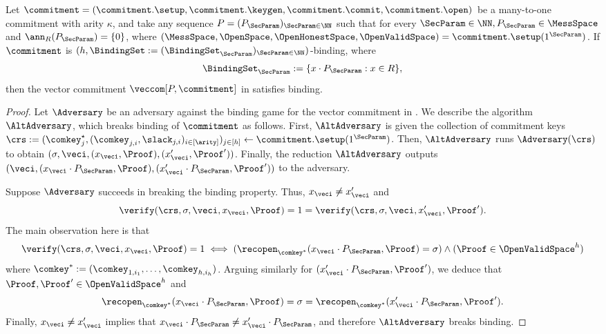     \begin{lemma}\label{lem:VC-binding}
    Let  $\commitment = (\commitment.\setup, \commitment.\keygen,\commitment.\commit,\commitment.\open)$ be a many-to-one commitment with arity $\kappa$, and take any sequence $P = (P_\SecParam)_{\SecParam \in \NN}$ such that for every $\SecParam \in \NN, P_\SecParam \in \MessSpace$ and $\ann_R(P_\SecParam) = \{0\}$, where $ (\MessSpace,\OpenSpace,\OpenHonestSpace,\OpenValidSpace) = \commitment.\setup(1^\SecParam)$. If $\commitment$ is $(h,\BindingSet := (\BindingSet_\SecParam)_{\SecParam \in \NN})$-binding, where \[\BindingSet_\SecParam := \{ x \cdot P_\SecParam : x \in R\},\] then the vector commitment $\veccom[P,\commitment]$ in  satisfies binding.
    \end{lemma}
    \begin{proof}
    Let $\Adversary$ be an adversary against the binding game for the vector commitment in . We describe the algorithm $\AltAdversary$, which breaks binding of $\commitment$ as follows. First, $\AltAdversary$ is given the collection of commitment keys  $\crs:= (\comkey^\star_j,(\comkey_{j,i},\slack_{j,i})_{i\in [\arity]})_{j \in [h]} \gets \commitment.\setup(1^\SecParam)$. Then, $\AltAdversary$ runs $\Adversary(\crs)$  to obtain $(\sigma,\veci,(x_\veci,\Proof), (x'_\veci,\Proof'))$. Finally, the reduction $\AltAdversary$ outputs $(\veci,(x_\veci \cdot P_\SecParam,\Proof), (x'_\veci \cdot P_\SecParam,\Proof'))$ to the adversary.

    Suppose $\Adversary$ succeeds in breaking the binding property. Thus, $x_\veci \neq x'_\veci$ and
    \[ \verify(\crs,\sigma,\veci,x_\veci,\Proof) = 1 = \verify(\crs,\sigma,\veci,x'_\veci,\Proof').\]
    The main observation here is that
    \[ \verify(\crs,\sigma,\veci,x_\veci,\Proof) = 1 \iff (\recopen_{\comkey^*}(x_\veci \cdot P_\SecParam, \Proof) = \sigma) \land (\Proof \in \OpenValidSpace^h)\]
    where $\comkey^* := (\comkey_{1,i_1},\ldots,\comkey_{h,i_h})$. Arguing similarly for $(x'_\veci \cdot P_\SecParam,\Proof')$, we deduce that $\Proof,\Proof' \in \OpenValidSpace^h$ and
    \[\recopen_{\comkey^*}(x_\veci \cdot P_\SecParam, \Proof) = \sigma = \recopen_{\comkey^*}(x'_\veci \cdot P_\SecParam, \Proof').\]
    Finally, $x_\veci \neq x'_\veci$ implies that $x_\veci \cdot P_\SecParam \neq x'_\veci \cdot P_\SecParam$, and therefore $\AltAdversary$ breaks binding.
    \end{proof}



